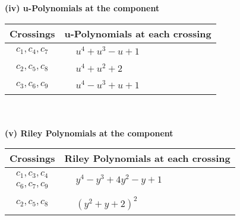 \documentclass[1p]{elsarticle_modified}
\theoremstyle{definition}
\begin{document}
\newpage\renewcommand{\arraystretch}{1}
\flushleft \textbf{(iv) u-Polynomials at the component}\newline \\
\begin{tabular}{m{50pt}|m{274pt}}
Crossings & \hspace{64pt}u-Polynomials at each crossing \\
\hline $$\begin{aligned}c_{1},c_{4},c_{7}\end{aligned}$$&$\begin{aligned}
&u^4+u^3- u+1
\end{aligned}$\\
\hline $$\begin{aligned}c_{2},c_{5},c_{8}\end{aligned}$$&$\begin{aligned}
&u^4+u^2+2
\end{aligned}$\\
\hline $$\begin{aligned}c_{3},c_{6},c_{9}\end{aligned}$$&$\begin{aligned}
&u^4- u^3+u+1
\end{aligned}$\\
\hline
\end{tabular}\\~\\
\newpage\renewcommand{\arraystretch}{1}
\flushleft \textbf{(v) Riley Polynomials at the component}\newline \\
\begin{tabular}{m{50pt}|m{274pt}}
Crossings & \hspace{64pt}Riley Polynomials at each crossing \\
\hline $$\begin{aligned}c_{1},c_{3},c_{4}\\c_{6},c_{7},c_{9}\end{aligned}$$&$\begin{aligned}
&y^4- y^3+4 y^2- y+1
\end{aligned}$\\
\hline $$\begin{aligned}c_{2},c_{5},c_{8}\end{aligned}$$&$\begin{aligned}
&(y^2+y+2)^2
\end{aligned}$\\
\hline
\end{tabular}\\~\\
\end{document}
